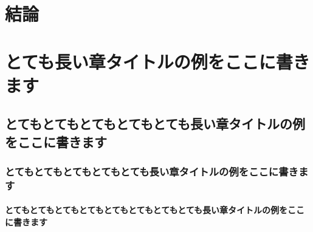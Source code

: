 \chapter{結論}

\chapter{とても長い章タイトルの例をここに書きます}
\section{とてもとてもとてもとてもとても長い章タイトルの例をここに書きます}
\subsection{とてもとてもとてもとてもとても長い章タイトルの例をここに書きます}
\subsubsection{とてもとてもとてもとてもとてもとてもとてもとても長い章タイトルの例をここに書きます}